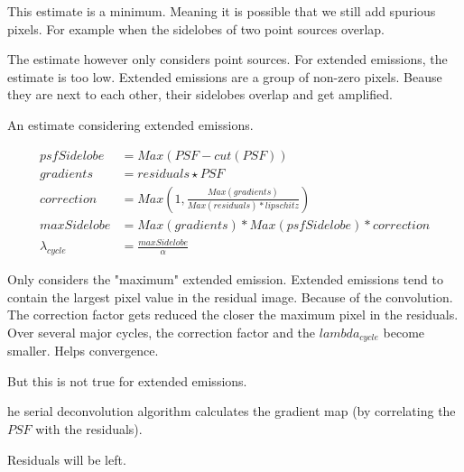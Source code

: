 This estimate is a minimum. Meaning it is possible that we still add spurious pixels. For example when the sidelobes of two point sources overlap.

The estimate however only considers point sources. For extended emissions, the estimate is too low. Extended emissions are a group of non-zero pixels. Beause they are next to each other, their sidelobes overlap and get amplified. 

An estimate considering extended emissions.

\begin{equation}
\begin{split}
psfSidelobe &= Max(PSF - cut(PSF)) \\
gradients &= residuals \star PSF \\
correction &= Max(1, \frac{Max(gradients)}{Max(residuals) * lipschitz}) \\
maxSidelobe &= Max(gradients) * Max(psfSidelobe) * correction \\
\lambda_{cycle} &= \frac{maxSidelobe}{\alpha}
\end{split}
\end{equation}

Only considers the "maximum" extended emission. Extended emissions tend to contain the largest pixel value in the residual image. Because of the convolution.
The correction factor gets reduced the closer the maximum pixel in the residuals. Over several major cycles, the correction factor and the $lambda_{cycle}$ become smaller. 
Helps convergence.


But this is not true for extended emissions.

he serial deconvolution algorithm calculates the gradient map (by correlating the $PSF$ with the residuals).


Residuals will be left. 



